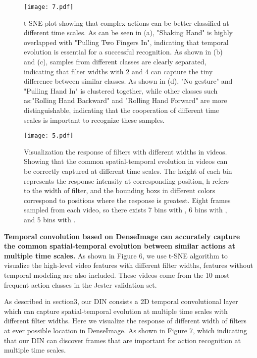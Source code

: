 \documentclass{article}
\begin{document}
\begin{figure*}[!htbp]
	\begin{center}
		\texttt{[image: 7.pdf]}
		\caption{t-SNE plot showing that complex actions can be better classified at different time scales. As can be seen in (a), "Shaking Hand" is highly overlapped with "Pulling Two Fingers In", indicating that temporal evolution is essential for a successful recognition. As shown in (b) and (c), samples from different classes are clearly separated, indicating that filter widths with 2 and 4 can capture the tiny difference between similar classes. As shown in (d), "No gesture" and "Pulling Hand In" is clustered together, while other classes such as:"Rolling Hand Backward" and "Rolling Hand Forward" are more distinguishable, indicating that the cooperation  of different time scales is important to recognize these samples.}
		\label{Figure 6.}
	\end{center}
	\vspace{-0.5em}
\end{figure*}
\begin{figure*}[h]
	\begin{center}
		\texttt{[image: 5.pdf]}
		\caption{Visualization the response of filters with different widths in videos. Showing that the common spatial-temporal evolution in videos can be correctly captured at different time scales. The height of each bin represents the response intensity at corresponding position, h refers to the width of filter, and the bounding boxs in different colors correspond to positions where the response is greatest. Eight frames sampled from each video, so there exists 7 bins with , 6 bins with , and 5 bins with .}
		\label{Figure 7.}
	\end{center}
	\vspace{-0.5em}
\end{figure*}

\textbf{Temporal convolution based on DenseImage can accurately capture the common spatial-temporal evolution between similar actions at multiple time scales.} As shown in Figure 6, we use t-SNE algorithm to visualize the high-level video features with different filter widths, features without temporal modeling are  also included. These videos come from the 10 most frequent action classes in the Jester validation set.

As described in section3, our DIN consists a 2D temporal convolutional layer which can capture spatial-temporal evolution at multiple time scales with different filter widths. Here we visualize the response of different width of filters at ever possible location in DenseImage. As shown in Figure 7, which indicating that our DIN can discover frames that are important for action recognition at multiple time scales.
\end{document}
